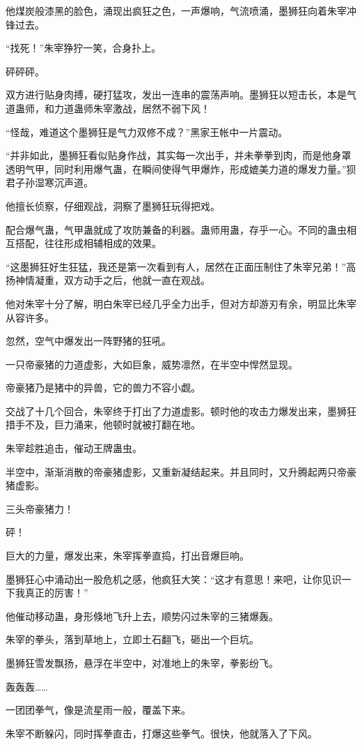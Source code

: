\begin{this_body}
他煤炭般漆黑的脸色，涌现出疯狂之色，一声爆响，气流喷涌，墨狮狂向着朱宰冲锋过去。

“找死！”朱宰狰狞一笑，合身扑上。

砰砰砰。

双方进行贴身肉搏，硬打猛攻，发出一连串的震荡声响。墨狮狂以短击长，本是气道蛊师，和力道蛊师朱宰激战，居然不弱下风！

“怪哉，难道这个墨狮狂是气力双修不成？”黑家王帐中一片震动。

“并非如此，墨狮狂看似贴身作战，其实每一次出手，并未拳拳到肉，而是他身罩透明气甲，同时利用爆气蛊，在瞬间使得气甲爆炸，形成媲美力道的爆发力量。”狈君子孙湿寒沉声道。

他擅长侦察，仔细观战，洞察了墨狮狂玩得把戏。

配合爆气蛊，气甲蛊就成了攻防兼备的利器。蛊师用蛊，存乎一心。不同的蛊虫相互搭配，往往形成相辅相成的效果。

“这墨狮狂好生狂猛，我还是第一次看到有人，居然在正面压制住了朱宰兄弟！”高扬神情凝重，双方动手之后，他就一直在观战。

他对朱宰十分了解，明白朱宰已经几乎全力出手，但对方却游刃有余，明显比朱宰从容许多。

忽然，空气中爆发出一阵野猪的狂吼。

一只帝豪猪的力道虚影，大如巨象，威势凛然，在半空中悍然显现。

帝豪猪乃是猪中的异兽，它的兽力不容小觑。

交战了十几个回合，朱宰终于打出了力道虚影。顿时他的攻击力爆发出来，墨狮狂措手不及，巨力涌来，他顿时就被打翻在地。

朱宰趁胜追击，催动王牌蛊虫。

半空中，渐渐消散的帝豪猪虚影，又重新凝结起来。并且同时，又升腾起两只帝豪猪虚影。

三头帝豪猪力！

砰！

巨大的力量，爆发出来，朱宰挥拳直捣，打出音爆巨响。

墨狮狂心中涌动出一股危机之感，他疯狂大笑：“这才有意思！来吧，让你见识一下我真正的厉害！”

他催动移动蛊，身形倏地飞升上去，顺势闪过朱宰的三猪爆轰。

朱宰的拳头，落到草地上，立即土石翻飞，砸出一个巨坑。

墨狮狂雪发飘扬，悬浮在半空中，对准地上的朱宰，拳影纷飞。

轰轰轰……

一团团拳气，像是流星雨一般，覆盖下来。

朱宰不断躲闪，同时挥拳直击，打爆这些拳气。很快，他就落入了下风。


\end{this_body}
